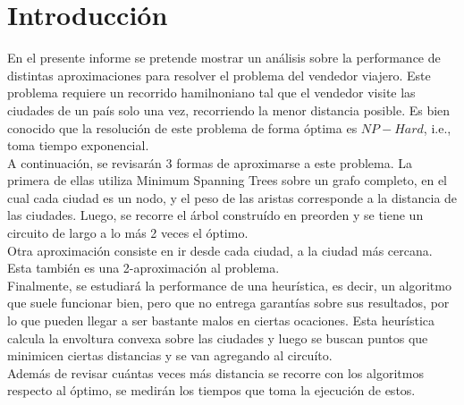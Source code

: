 \documentclass[12pt,letterpaper, margin = 3cm]{article}
\begin{document}

\tableofcontents

\newpage
\section{Introducción}

En el presente informe se pretende mostrar un análisis sobre la performance de distintas aproximaciones para resolver el problema del vendedor viajero. Este problema requiere un recorrido hamilnoniano tal que el vendedor visite las ciudades de un país solo una vez, recorriendo la menor distancia posible. Es bien conocido que la resolución de este problema de forma óptima es $NP-Hard$, i.e., toma tiempo exponencial.\\
A continuación, se revisarán 3 formas de aproximarse a este problema. La primera de ellas utiliza Minimum Spanning Trees sobre un grafo completo, en el cual cada ciudad es un nodo, y el peso de las aristas corresponde a la distancia de las ciudades. Luego, se recorre el árbol construído en preorden y se tiene un circuito de largo a lo más 2 veces el óptimo.\\
Otra aproximación consiste en ir desde cada ciudad, a la ciudad más cercana. Esta también es una 2-aproximación al problema.\\
Finalmente, se estudiará la performance de una heurística, es decir, un algoritmo que suele funcionar bien, pero que no entrega garantías sobre sus resultados, por lo que pueden llegar a ser bastante malos en ciertas ocaciones. Esta heurística calcula la envoltura convexa sobre las ciudades y luego se buscan puntos que minimicen ciertas distancias y se van agregando al circuíto.\\
Además de revisar cuántas veces más distancia se recorre con los algoritmos respecto al óptimo, se medirán los tiempos que toma la ejecución de estos.
\end{document}
